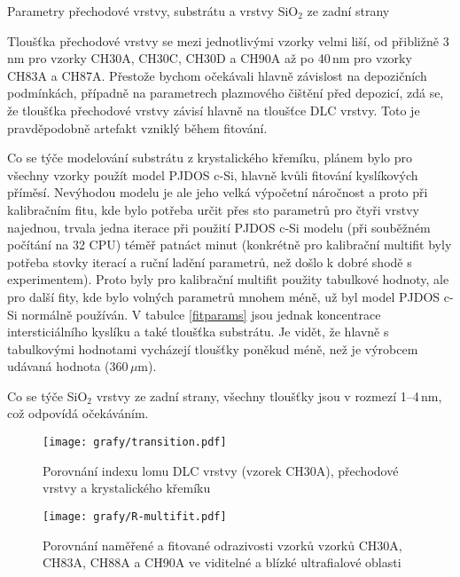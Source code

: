 \begin{table}[tbhp]
 \centering
	\renewcommand{\tabcolsep}{4pt}
 
 \caption{Parametry přechodové vrstvy, substrátu a vrstvy SiO$_2$ ze zadní strany}
\label{tsb-params}
\end{table}

Tloušťka přechodové vrstvy se mezi jednotlivými vzorky velmi liší, od přibližně 3\,nm pro vzorky CH30A, CH30C, CH30D a CH90A až po 40\,nm pro vzorky CH83A a CH87A. Přestože bychom očekávali hlavně závislost na depozičních podmínkách, případně na parametrech plazmového čištění před depozicí, zdá se, že tloušťka přechodové vrstvy závisí hlavně na tloušťce DLC vrstvy. Toto je pravděpodobně artefakt vzniklý během fitování.

Co se týče modelování substrátu z krystalického křemíku, plánem bylo pro všechny vzorky použít model PJDOS c-Si, hlavně kvůli fitování kyslíkových příměsí. Nevýhodou modelu je ale jeho velká výpočetní náročnost a proto při kalibračním fitu, kde bylo potřeba určit přes sto parametrů pro čtyři vrstvy najednou, trvala jedna iterace při použití PJDOS c-Si modelu (při souběžném počítání na 32 CPU) téměř patnáct minut (konkrétně pro kalibrační multifit byly potřeba stovky iterací a ruční ladění parametrů, než došlo k dobré shodě s experimentem). Proto byly pro kalibrační multifit použity tabulkové hodnoty, ale pro další fity, kde bylo volných parametrů mnohem méně, už byl model 
PJDOS c-Si normálně používán. V tabulce \ref{fitparams} jsou jednak koncentrace intersticiálního kyslíku a také tloušťka substrátu. Je vidět, že hlavně s tabulkovými hodnotami vycházejí tloušťky poněkud méně, než je výrobcem udávaná hodnota (360\,$\mu$m).

Co se týče SiO$_2$ vrstvy ze zadní strany, všechny tloušťky jsou v rozmezí 1--4\,nm, což odpovídá očekáváním.

\begin{figure}[tbhp]
	\texttt{[image: grafy/transition.pdf]}
	\caption{Porovnání indexu lomu DLC vrstvy (vzorek CH30A), přechodové vrstvy a krystalického křemíku} 
	\label{transition}
\end{figure}

\begin{figure}[ht]
	\texttt{[image: grafy/R-multifit.pdf]}
	\caption{Porovnání naměřené a fitované odrazivosti vzorků vzorků CH30A, CH83A, CH88A a CH90A ve viditelné a blízké ultrafialové oblasti}
	\label{R-multifit}
\end{figure}

